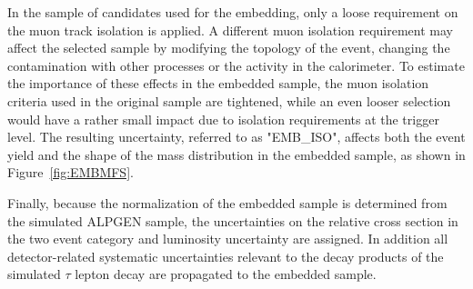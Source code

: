 %
%	
%

In the sample of  \Zmumu candidates used for the embedding,  only a loose requirement on the  muon track isolation is applied.
A different  muon isolation requirement may affect the selected sample by modifying the topology of the event, 
changing the contamination with other processes or the activity in the calorimeter. 
To estimate  the importance of these effects in the
embedded sample, the muon isolation criteria used in  the original \Zmumu sample are tightened,
while an even 
looser selection would have a rather small impact due to  isolation requirements at the trigger level.
The resulting uncertainty, referred to as "EMB\_ISO", affects both the event yield and the shape of 
the \mmc mass distribution in the embedded sample, as shown in Figure~\ref{fig:EMBMFS}. 

Finally, because the normalization of the embedded sample is determined from the simulated ALPGEN sample, 
the uncertainties on the relative cross section in the two event category and luminosity uncertainty are assigned. In addition
all detector-related systematic uncertainties relevant to the decay products of the simulated $\tau$ lepton 
decay are propagated to the embedded sample.
 

